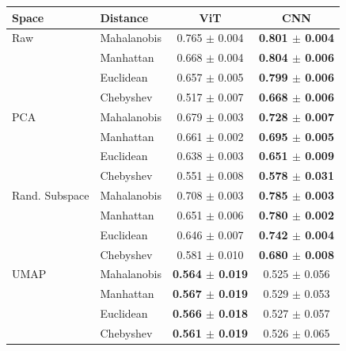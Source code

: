 \begin{tabular}{llcc}
\toprule
Space & Distance & ViT & CNN \\
\midrule
Raw & Mahalanobis & 0.765 $\pm$ 0.004 & \textbf{0.801 $\pm$ 0.004} \\
 & Manhattan & 0.668 $\pm$ 0.004 & \textbf{0.804 $\pm$ 0.006} \\
 & Euclidean & 0.657 $\pm$ 0.005 & \textbf{0.799 $\pm$ 0.006} \\
 & Chebyshev & 0.517 $\pm$ 0.007 & \textbf{0.668 $\pm$ 0.006} \\
\midrule
PCA & Mahalanobis & 0.679 $\pm$ 0.003 & \textbf{0.728 $\pm$ 0.007} \\
 & Manhattan & 0.661 $\pm$ 0.002 & \textbf{0.695 $\pm$ 0.005} \\
 & Euclidean & 0.638 $\pm$ 0.003 & \textbf{0.651 $\pm$ 0.009} \\
 & Chebyshev & 0.551 $\pm$ 0.008 & \textbf{0.578 $\pm$ 0.031} \\
\midrule
Rand. Subspace & Mahalanobis & 0.708 $\pm$ 0.003 & \textbf{0.785 $\pm$ 0.003} \\
 & Manhattan & 0.651 $\pm$ 0.006 & \textbf{0.780 $\pm$ 0.002} \\
 & Euclidean & 0.646 $\pm$ 0.007 & \textbf{0.742 $\pm$ 0.004} \\
 & Chebyshev & 0.581 $\pm$ 0.010 & \textbf{0.680 $\pm$ 0.008} \\
\midrule
UMAP & Mahalanobis & \textbf{0.564 $\pm$ 0.019} & 0.525 $\pm$ 0.056 \\
 & Manhattan & \textbf{0.567 $\pm$ 0.019} & 0.529 $\pm$ 0.053 \\
 & Euclidean & \textbf{0.566 $\pm$ 0.018} & 0.527 $\pm$ 0.057 \\
 & Chebyshev & \textbf{0.561 $\pm$ 0.019} & 0.526 $\pm$ 0.065 \\

\bottomrule
\end{tabular}